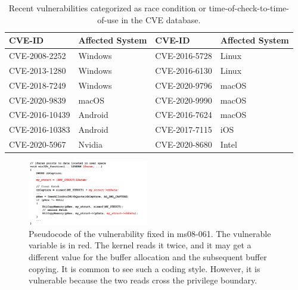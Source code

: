 \vspace*{-\baselineskip}

\begin{center}
\begin{table}[ht]
\small
\caption{Recent vulnerabilities categorized as race condition or time-of-check-to-time-of-use in the CVE database.}
\label{table:cves}
\centering
	\begin{tabular}{@{}>{\raggedright\arraybackslash}m{2.40cm}@{}|
			@{}>{\centering\arraybackslash}m{1.50cm}@{}|
			@{}>{\centering\arraybackslash}m{2.40cm}@{}|
			@{}>{\centering\arraybackslash}m{1.35cm}@{} } 
\hline
CVE-ID & Affected System & CVE-ID & Affected System \\ %
\hline
CVE-2008-2252  & Windows & CVE-2016-5728 & Linux \\
CVE-2013-1280  & Windows & CVE-2016-6130 & Linux \\
CVE-2018-7249  & Windows & CVE-2020-9796 & macOS \\ 
CVE-2020-9839  & macOS   & CVE-2020-9990 & macOS \\
CVE-2016-10439 & Android & CVE-2016-7624 & macOS \\
CVE-2016-10383 & Android & CVE-2017-7115 & iOS   \\

CVE-2020-5967  & Nvidia  & CVE-2020-8680 & Intel \\
\hline
\end{tabular}
\end{table}
\end{center}

\vspace*{-\baselineskip}



\begin{figure}[th]
	\includegraphics[width=0.47\textwidth]{figures/code08061}
	\centering
	\caption{Pseudocode of the vulnerability fixed in ms08-061. The vulnerable variable is in red. The kernel reads it twice, and it may get a different value for the buffer allocation and the subsequent buffer copying. It is common to see such a coding style. However, it is vulnerable because the two reads cross the privilege boundary.}
	\label{fig:code08061}
\end{figure}



